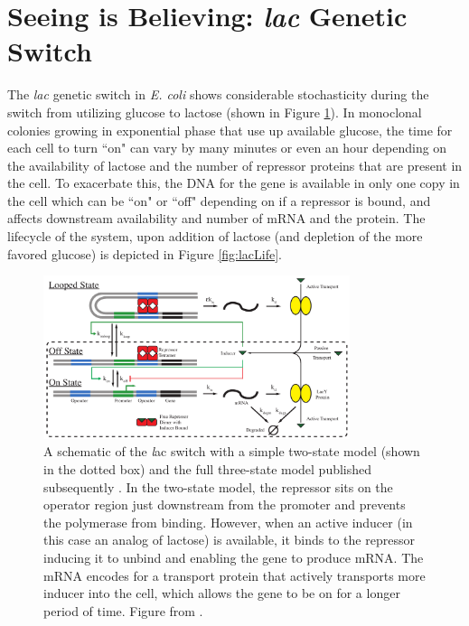 \section{Seeing is Believing: {\it lac} Genetic Switch}

The {\it lac} genetic switch in {\it E. coli} shows considerable stochasticity during the switch from utilizing glucose to lactose \cite{Roberts2011nci} (shown in Figure \ref{fig:lacSwitch}).  In monoclonal colonies growing in exponential phase that use up available glucose, the time for each cell to turn ``on" can vary by many minutes or even an hour depending on the availability of lactose and the number of repressor proteins that are present in the cell. To exacerbate this, the DNA for the gene is available in only one copy in the cell which can be ``on" or ``off" depending on if a repressor is bound, and affects downstream availability and number of mRNA and the protein.  The lifecycle of the system, upon addition of lactose (and depletion of the more favored glucose) is depicted in Figure \ref{fig:lacLife}.

\begin{figure}[h!]
  \centering
        \includegraphics[width=0.8\textwidth]{Figures/LacThreeState.pdf}
        \caption{A schematic of the {\emph lac} switch with a simple two-state model \cite{Roberts2011nci} (shown in the dotted box) and the full three-state model published subsequently \cite{Earnest2013dli}. In the two-state model, the repressor sits on the operator region just downstream from the promoter and prevents the polymerase from binding.  However, when an active inducer (in this case an analog of lactose) is available, it binds to the repressor inducing it to unbind and enabling the gene to produce mRNA.  The mRNA encodes for a transport protein that actively transports more inducer into the cell, which allows the gene to be on for a longer period of time. Figure from \cite{Peterson2013}.} \label{fig:lacSwitch}
\end{figure}


